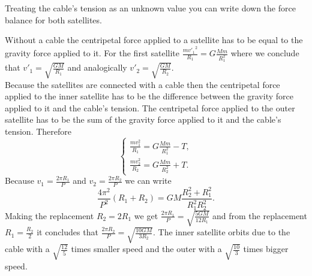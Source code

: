 \hinteng
Treating the cable’s tension as an unknown value you can write down the force balance for both satellites.

\solueng
Without a cable the centripetal force applied to a satellite has to be equal to the gravity force applied to it. For the first satellite $\frac{{mv'_1}^2}{R_1}=G\frac{Mm}{R_1^2}$ where we conclude that $v'_1=\sqrt{\frac{GM}{R_1}}$ and analogically $v'_2=\sqrt{\frac{GM}{R_2}}$.\\
Because the satellites are connected with a cable then the centripetal force applied to the inner satellite has to be the difference between the gravity force applied to it and the cable’s tension. The centripetal force applied to the outer satellite has to be the sum of the gravity force applied to it and the cable’s tension. Therefore
$$\begin{cases}
\frac{mv_1^2}{R_1}=G\frac{Mm}{R_1^2}-T,\\
\frac{mv_2^2}{R_2}=G\frac{Mm}{R_2^2}+T.
\end{cases}$$
Because $v_1=\frac{2\pi R_1}{P}$ and $v_2=\frac{2\pi R_2}{P}$ we can write 
$$\frac{4\pi^2}{P^2}\left(R_1+R_2\right)=GM\frac{R_2^2+R_1^2}{R_1^2R_2^2}.$$
Making the replacement $R_2=2R_1$ we get $\frac{2\pi R_1}{P}=\sqrt{\frac{5GM}{12R_1}}$ and from the replacement $R_1=\frac{R_2}{2}$ it concludes that $\frac{2\pi R_2}{P}=\sqrt{\frac{10GM}{3R_2}}$. The inner satellite orbits due to the cable with a $\sqrt{\frac{12}{5}}$ times smaller speed and the outer with a $\sqrt{\frac{10}{3}}$ times bigger speed.
\probend